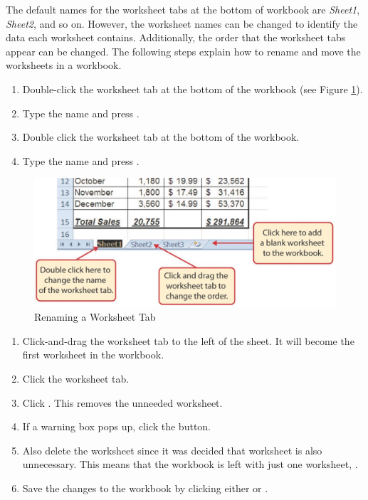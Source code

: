 The default names for the worksheet tabs at the bottom of workbook are \textit{Sheet1}, \textit{Sheet2}, and so on. However, the worksheet names can be changed to identify the data each worksheet contains. Additionally, the order that the worksheet tabs appear can be changed. The following steps explain how to rename and move the worksheets in a workbook.

\begin{enumerate}
	\item Double-click the  worksheet tab at the bottom of the workbook (see Figure \ref{01:fig47}). 
	\item Type the name  and press .
	\item Double click the  worksheet tab at the bottom of the workbook.
	\item Type the name  and press .
\end{enumerate}

\begin{figure}[H]
	\centering
	\includegraphics[width=\maxwidth{.95\linewidth}]{gfx/ch01_fig47}
	\caption{Renaming a Worksheet Tab}
	\label{01:fig47}
\end{figure}

\begin{enumerate}
	\item Click-and-drag the  worksheet tab to the left of the  sheet. It will become the first worksheet in the workbook.
	\item Click the  worksheet tab.
	\item Click . This removes the unneeded worksheet.
	\item If a warning box pops up, click the  button.
	\item Also delete the  worksheet since it was decided that worksheet is also unnecessary. This means that the workbook is left with just one worksheet, .
	\item Save the changes to the workbook by clicking either  or .
\end{enumerate}

